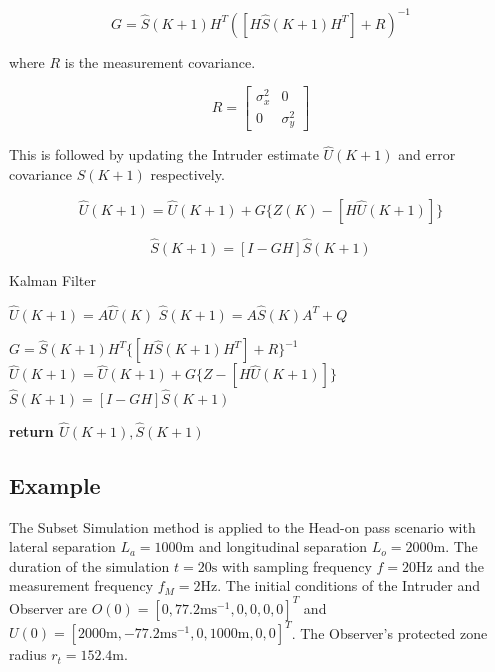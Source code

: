 \documentclass[journal]{IEEEtran}
\begin{document}
\begin{equation}
G = \hat{S}(K+1)H^{T}([H\hat{S}(K+1)H^{T}]+R)^{-1}
\label{eq:kalman_gain}
\end{equation}

\noindent where $R$ is the measurement covariance.

\begin{equation}
R = \begin{bmatrix}
\sigma_{x}^{2} & 0 \\	
0 & \sigma_{y}^{2} 
\end{bmatrix} 
\end{equation}

\noindent This is followed by updating the Intruder estimate $\hat{U}(K+1)$ and error covariance $\hat{S}(K+1)$ respectively.

\begin{equation}
\hat{U}(K+1) = \hat{U}(K+1)+G\{Z(K)-[H\hat{U}(K+1)]\}
\label{eq:kalman_est}
\end{equation}

\begin{equation}
\hat{S}(K+1) = [I - GH]\hat{S}(K+1)
\label{eq:kalman_cov}
\end{equation}

\begin{algorithm}\caption{Kalman Filter}
	\label{alg:kalman_filter}
	\begin{algorithmic}[1]	

		\State $\hat{U}(K+1) = A\hat{U}(K)$
		\State $\hat{S}(K+1) = A\hat{S}(K)A^{T}+Q$
	
			\State $G = \hat{S}(K+1)H^{T} \{[H\hat{S}(K+1)H^{T}]+R\}^{-1}$
			\State $\hat{U}(K+1) = \hat{U}(K+1)+G\{Z-[H\hat{U}(K+1)]\}$
			\State $\hat{S}(K+1) = [I - GH]\hat{S}(K+1)$
		\EndIf
		
\State \textbf{return $\hat{U}(K+1), \hat{S}(K+1)$}
	\EndFunction	
	\end{algorithmic}
\end{algorithm}

\subsection{Example}
The Subset Simulation method is applied to the Head-on pass scenario with lateral separation $L_{a} = 1000\text{m}$ and longitudinal separation $L_{o} = 2000\text{m}$. The duration of the simulation $t = 20\text{s}$ with sampling frequency $f = 20\text{Hz}$ and the measurement frequency $f_{M} = 2\text{Hz}$. The initial conditions of the Intruder and Observer are $O(0) = [0,77.2 \text{ms}^{-1},0,0,0,0]^{T}$ and $U(0) = [2000 \text{m},-77.2 \text{ms}^{-1},0,1000 \text{m},0,0]^{T}$. The Observer's protected zone radius $r_{t} = 152.4\text{m}$.
\end{document}
